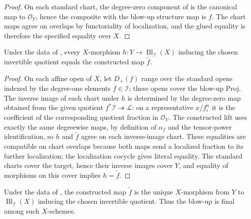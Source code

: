 \begin{proof}
  \leanok
  On each standard chart, the degree-zero component of
   is the canonical map to
  $\mathcal O_Y$, hence the composite with the blow-up structure map is $f$.
  The chart maps agree on overlaps by functoriality of localization, and the
  glued equality is therefore the specified equality over $X$.
\end{proof}

\begin{lemma}
  \label{lemma:nagata-blowup-universal-unique}
  \leanok

  Under the data of , every $X$-morphism
  $h\colon Y\to\operatorname{Bl}_{\mathcal I}(X)$ inducing the chosen
  invertible quotient equals the constructed map $\widetilde f$.
\end{lemma}

\begin{proof}
  \leanok
  On each affine open of $X$, let $D_+(f)$ range over the standard opens
  indexed by the degree-one elements $f\in\mathcal I$; these opens cover the
  blow-up Proj.  The inverse image of each chart
  under $h$ is determined by the degree-zero map obtained from the given
  quotient $f^*\mathcal I\twoheadrightarrow\mathcal L$: on a representative
  $x/f_i^n$ it is the coefficient of the corresponding quotient fraction in
  $\mathcal O_Y$.  The constructed lift uses exactly the same degreewise maps,
  by definition of $\alpha_f$ and the tensor-power identification, so $h$ and
  $\widetilde f$ agree on each inverse-image chart.  These equalities are
  compatible on chart overlaps because both maps send a localized fraction to
  its further localization; the localization cocycle gives literal equality.
  The standard charts cover the target, hence their inverse images cover $Y$,
  and equality of morphisms on this cover implies $h=\widetilde f$.
\end{proof}

\begin{theorem}
  \label{thm:nagata-blowup-universal-property}
  \leanok

  Under the data of , the constructed
  map $\widetilde f$ is the unique $X$-morphism from $Y$ to
  $\operatorname{Bl}_{\mathcal I}(X)$ inducing the chosen invertible
  quotient.  Thus the blow-up is final among such $X$-schemes.
\end{theorem}


